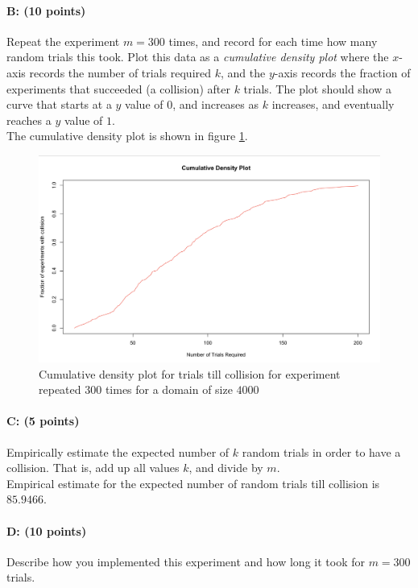 \documentclass[11pt]{article}
\begin{document}
\paragraph{B: (10 points)}  
Repeat the experiment $m = 300$ times, and record for each time how many random trials this took.  Plot this data as a \emph{cumulative density plot} where the $x$-axis records the number of trials required $k$, and the $y$-axis records the fraction of experiments that succeeded (a collision) after $k$ trials.  The plot should show a curve that starts at a $y$ value of $0$, and increases as $k$ increases, and eventually reaches a $y$ value of $1$.  \\

The cumulative density plot is shown in figure \ref{cumplot1}.

\begin{figure}[!htb]
\centering
\includegraphics[width=5.5in]{figures/cumdenplot1b.png}
\caption{Cumulative density plot for trials till collision for experiment repeated $300$ times for a domain of size $4000$}
\label{cumplot1}
\end{figure}

\paragraph{C: (5 points)}  
Empirically estimate the expected number of $k$ random trials in order to have a collision.  That is, add up all values $k$, and divide by $m$.  \\

Empirical estimate for the expected number of random trials till collision is $85.9466$.

\paragraph{D: (10 points)}  
Describe how you implemented this experiment and how long it took for $m = 300$ trials.  \\
\end{document}
